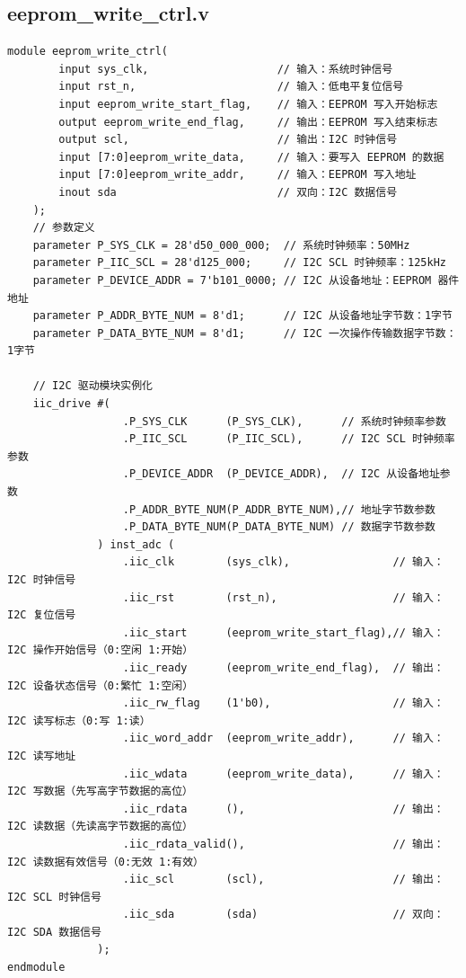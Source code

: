\documentclass[a4paper,10pt]{article}
\begin{document}
\subsection{eeprom_write_ctrl.v}
\begin{lstlisting}[caption=eeprom_write_ctrl.v]
module eeprom_write_ctrl(
        input sys_clk,                    // 输入：系统时钟信号
        input rst_n,                      // 输入：低电平复位信号
        input eeprom_write_start_flag,    // 输入：EEPROM 写入开始标志
        output eeprom_write_end_flag,     // 输出：EEPROM 写入结束标志
        output scl,                       // 输出：I2C 时钟信号
        input [7:0]eeprom_write_data,     // 输入：要写入 EEPROM 的数据
        input [7:0]eeprom_write_addr,     // 输入：EEPROM 写入地址
        inout sda                         // 双向：I2C 数据信号
    );
    // 参数定义
    parameter P_SYS_CLK = 28'd50_000_000;  // 系统时钟频率：50MHz
    parameter P_IIC_SCL = 28'd125_000;     // I2C SCL 时钟频率：125kHz
    parameter P_DEVICE_ADDR = 7'b101_0000; // I2C 从设备地址：EEPROM 器件地址
    parameter P_ADDR_BYTE_NUM = 8'd1;      // I2C 从设备地址字节数：1字节
    parameter P_DATA_BYTE_NUM = 8'd1;      // I2C 一次操作传输数据字节数：1字节

    // I2C 驱动模块实例化
    iic_drive #(
                  .P_SYS_CLK      (P_SYS_CLK),      // 系统时钟频率参数
                  .P_IIC_SCL      (P_IIC_SCL),      // I2C SCL 时钟频率参数
                  .P_DEVICE_ADDR  (P_DEVICE_ADDR),  // I2C 从设备地址参数
                  .P_ADDR_BYTE_NUM(P_ADDR_BYTE_NUM),// 地址字节数参数
                  .P_DATA_BYTE_NUM(P_DATA_BYTE_NUM) // 数据字节数参数
              ) inst_adc (
                  .iic_clk        (sys_clk),                // 输入：I2C 时钟信号
                  .iic_rst        (rst_n),                  // 输入：I2C 复位信号
                  .iic_start      (eeprom_write_start_flag),// 输入：I2C 操作开始信号（0:空闲 1:开始）
                  .iic_ready      (eeprom_write_end_flag),  // 输出：I2C 设备状态信号（0:繁忙 1:空闲）
                  .iic_rw_flag    (1'b0),                   // 输入：I2C 读写标志（0:写 1:读）
                  .iic_word_addr  (eeprom_write_addr),      // 输入：I2C 读写地址
                  .iic_wdata      (eeprom_write_data),      // 输入：I2C 写数据（先写高字节数据的高位）
                  .iic_rdata      (),                       // 输出：I2C 读数据（先读高字节数据的高位）
                  .iic_rdata_valid(),                       // 输出：I2C 读数据有效信号（0:无效 1:有效）
                  .iic_scl        (scl),                    // 输出：I2C SCL 时钟信号
                  .iic_sda        (sda)                     // 双向：I2C SDA 数据信号
              );
endmodule

\end{lstlisting}
\end{document}
